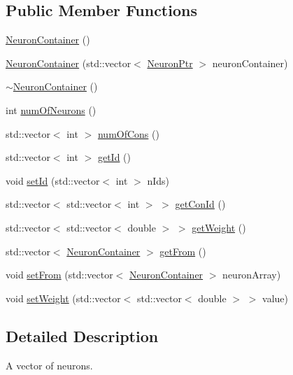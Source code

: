 \subsection*{Public Member Functions}
\begin{DoxyCompactItemize}
\item 
\hyperlink{class_neuron_container_a9b22029b084f7446d2dfafc2e8f89700}{NeuronContainer} ()
\item 
\hyperlink{class_neuron_container_a85e1e7946db7317179adbe359dc4ac39}{NeuronContainer} (std::vector$<$ \hyperlink{_a_m_o_r_e_8h_ac1ea936c2c7728eb382278131652fef4}{NeuronPtr} $>$ neuronContainer)
\item 
\hyperlink{class_neuron_container_a908e984efdd9dc08b507c95b23b295dd}{$\sim$NeuronContainer} ()
\item 
int \hyperlink{class_neuron_container_a37132392f025c0358d2f47a03bb4854f}{numOfNeurons} ()
\item 
std::vector$<$ int $>$ \hyperlink{class_neuron_container_a70c5fd8e735b04c48b29cc17b77ff301}{numOfCons} ()
\item 
std::vector$<$ int $>$ \hyperlink{class_neuron_container_a2ca2c86b3a0517636b1a0b3debfd158d}{getId} ()
\item 
void \hyperlink{class_neuron_container_a17c57249055e5de605e9663384ca48ce}{setId} (std::vector$<$ int $>$ nIds)
\item 
std::vector$<$ std::vector$<$ int $>$ $>$ \hyperlink{class_neuron_container_ad3ce88ba0e1beba4b60bac38c1cd2ccd}{getConId} ()
\item 
std::vector$<$ std::vector$<$ double $>$ $>$ \hyperlink{class_neuron_container_ad11f5391b58f32b6db45f31fdc4927e7}{getWeight} ()
\item 
std::vector$<$ \hyperlink{class_neuron_container}{NeuronContainer} $>$ \hyperlink{class_neuron_container_a3a0ea5632f0dfbf3159db657d6de84db}{getFrom} ()
\item 
void \hyperlink{class_neuron_container_a058524958a0fe0dfd946d9e7f4003310}{setFrom} (std::vector$<$ \hyperlink{class_neuron_container}{NeuronContainer} $>$ neuronArray)
\item 
void \hyperlink{class_neuron_container_a54d5bfaf428ab9bc66aac79c312ab997}{setWeight} (std::vector$<$ std::vector$<$ double $>$ $>$ value)
\end{DoxyCompactItemize}


\subsection{Detailed Description}
A vector of neurons. 

